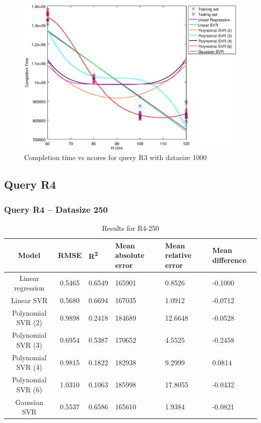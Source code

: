 \documentclass[a4paper,11pt]{article}
\begin{document}
\begin {figure}[hbtp]
\centering
\includegraphics[width=\textwidth]{output/R3_1000_ONLY_1_LINEAR_NCORE/plot_R3_1000.eps}
\caption{Completion time vs ncores for query R3 with datasize 1000}
\label{fig:coreonly_linear_R3_1000}
\end {figure}

\newpage
\subsection{Query R4}
\subsubsection{Query R4 -- Datasize 250}
\begin{table}[H]
	\centering
	\begin{adjustbox}{center}
		\begin{tabular}{c | c M{1.2cm} M{2.5cm} M{2.5cm} M{1.8cm}}
			Model & RMSE & R\textsuperscript{2} & Mean absolute error & Mean relative error & Mean difference \tabularnewline
			\hline
			Linear regression & 0.5465 & 0.6549 & 165901 & 0.8526 & -0.1000 \\
			Linear SVR & 0.5680 & 0.6694 & 167035 & 1.0912 & -0.0712 \\
			Polynomial SVR (2) & 0.9898 & 0.2418 & 184689 & 12.6648 & -0.0528 \\
			Polynomial SVR (3) & 0.6954 & 0.5387 & 170652 & 4.5525 & -0.2458 \\
			Polynomial SVR (4) & 0.9815 & 0.1822 & 182938 & 9.2999 & 0.0814 \\
			Polynomial SVR (6) & 1.0310 & 0.1063 & 185998 & 17.8055 & -0.0432 \\
			Gaussian SVR & 0.5537 & 0.6586 & 165610 & 1.9384 & -0.0821 \\
		\end{tabular}
	\end{adjustbox}
	\\
	\caption{Results for R4-250}
	\label{fig:coreonly_linear_R4_250}
\end{table}
\end{document}
